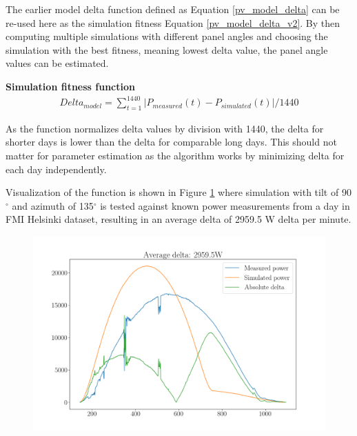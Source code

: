 The earlier model delta function defined as Equation \ref{pv_model_delta} can be re-used here as the simulation fitness Equation \ref{pv_model_delta_v2}. By then computing multiple simulations with different panel angles and choosing the simulation with the best fitness, meaning lowest delta value, the panel angle values can be estimated.

\vspace{6mm}
\noindent\textbf{Simulation fitness function}
\begin{equation}
\begin{split}
\label{pv_model_delta_v2}
Delta_{model} = \sum_{t=1}^{1440} |P_{measured}(t) - P_{simulated}(t)| /1440
\end{split}
\end{equation}

\noindent As the function normalizes delta values by division with 1440, the delta for shorter days is lower than the delta for comparable long days. This should not matter for parameter estimation as the algorithm works by minimizing delta for each day independently. 

Visualization of the function is shown in Figure \ref{fig_simulation_fitness} where simulation with tilt of 90$^\circ$ and azimuth of 135$^\circ$ is tested against known power measurements from a day in FMI Helsinki dataset, resulting in an average delta of 2959.5 W delta per minute.


\begin{figure}[h]
\centering
\includegraphics[width=0.85\linewidth]{pics/measured_vs_simulated} %
\label{fig_simulation_fitness}
\end{figure}




\newpage
